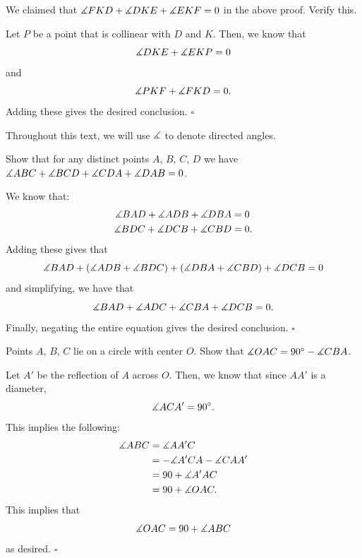 \documentclass{article}
\begin{document}
\begin{problem}[1.28]{}
We claimed that $\measuredangle FKD + \measuredangle DKE + \measuredangle EKF = 0$ in the above proof. Verify this.
\end{problem}
Let $P$ be a point that is collinear with $D$ and $K$. Then, we know that \[\measuredangle DKE + \measuredangle EKP = 0\] and \[\measuredangle PKF + \measuredangle FKD = 0.\] Adding these gives the desired conclusion. $\square$

\begin{remark*}
Throughout this text, we will use $\measuredangle$ to denote directed angles.
\end{remark*}

\begin{problem}[1.29]{}
Show that for any distinct points $A$, $B$, $C$, $D$ we have $\measuredangle ABC + \measuredangle BCD + \measuredangle CDA + \measuredangle DAB = 0$.
\end{problem}
We know that:
\begin{align*}
\measuredangle BAD + \measuredangle ADB + \measuredangle DBA &= 0 \\
\measuredangle BDC + \measuredangle DCB + \measuredangle CBD &= 0.
\end{align*}
Adding these gives that \[\measuredangle BAD + (\measuredangle ADB +\measuredangle BDC) + (\measuredangle DBA + \measuredangle CBD) + \measuredangle DCB  = 0\] and simplifying, we have that \[\measuredangle BAD + \measuredangle ADC + \measuredangle CBA + \measuredangle DCB = 0.\] Finally, negating the entire equation gives the desired conclusion. $\square$

\begin{problem}[1.30]{}
Points $A$, $B$, $C$ lie on a circle with center $O$. Show that $\measuredangle OAC = 90^\circ - \measuredangle CBA$.
\end{problem}
Let $A'$ be the reflection of $A$ across $O$. Then, we know that since $AA'$ is a diameter, \[\measuredangle ACA' = 90^\circ.\] This implies the following:
\begin{align*}
\measuredangle ABC &= \measuredangle AA'C \\
&= -\measuredangle A'CA - \measuredangle CAA' \\
&= 90 + \measuredangle A'AC \\
&= 90 + \measuredangle OAC.
\end{align*}
This implies that \[\measuredangle OAC = 90+\measuredangle ABC\] as desired. $\square$

\newpage
\end{document}
